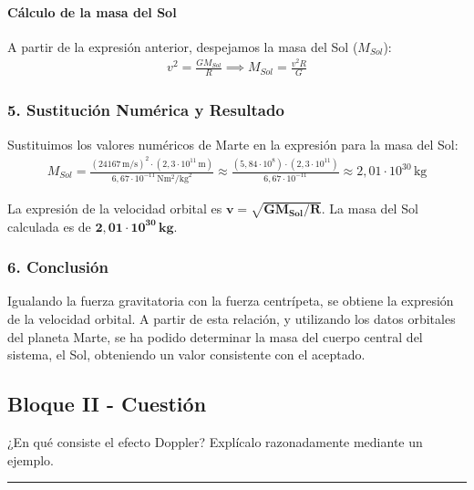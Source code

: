 \paragraph*{Cálculo de la masa del Sol}
A partir de la expresión anterior, despejamos la masa del Sol ($M_{Sol}$):
\begin{gather}
    v^2 = \frac{G M_{Sol}}{R} \implies M_{Sol} = \frac{v^2 R}{G}
\end{gather}

\subsubsection*{5. Sustitución Numérica y Resultado}
Sustituimos los valores numéricos de Marte en la expresión para la masa del Sol:
\begin{gather}
    M_{Sol} = \frac{(24167\,\text{m/s})^2 \cdot (2,3\cdot10^{11}\,\text{m})}{6,67\cdot10^{-11}\,\text{N}\text{m}^2/\text{kg}^2} \approx \frac{(5,84\cdot10^8) \cdot (2,3\cdot10^{11})}{6,67\cdot10^{-11}} \approx 2,01\cdot10^{30}\,\text{kg}
\end{gather}
\begin{cajaresultado}
La expresión de la velocidad orbital es $\boldsymbol{v = \sqrt{G M_{Sol} / R}}$. La masa del Sol calculada es de $\boldsymbol{2,01 \cdot 10^{30}\,\textbf{kg}}$.
\end{cajaresultado}

\subsubsection*{6. Conclusión}
\begin{cajaconclusion}
Igualando la fuerza gravitatoria con la fuerza centrípeta, se obtiene la expresión de la velocidad orbital. A partir de esta relación, y utilizando los datos orbitales del planeta Marte, se ha podido determinar la masa del cuerpo central del sistema, el Sol, obteniendo un valor consistente con el aceptado.
\end{cajaconclusion}
\newpage

\subsection{Bloque II - Cuestión}
\label{subsec:A2_2017_jul_ext}

\begin{cajaenunciado}
¿En qué consiste el efecto Doppler? Explícalo razonadamente mediante un ejemplo.
\end{cajaenunciado}
\hrule

